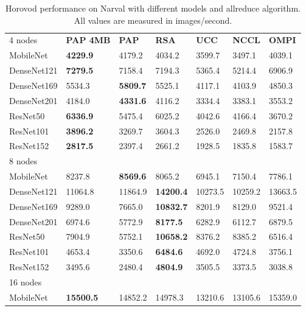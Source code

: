\begin{table}
    \centering
    \caption{
        Horovod performance on Narval with different models and allreduce algorithm.
        All values are measured in images/second.
    }
    \begin{tabular}{lllllll}
     4 nodes    & \textbf{PAP 4MB} & \textbf{PAP} & \textbf{RSA} & \textbf{UCC} & \textbf{NCCL} & \textbf{OMPI} \\
    MobileNet   & \textbf{4229.9}    & 4179.2       & 4034.2  & 3599.7  & 3497.1  & 4039.1  \\
    DenseNet121 & \textbf{7279.5}    & 7158.4       & 7194.3  & 5365.4  & 5214.4  & 6906.9  \\
    DenseNet169 & 5534.3    & \textbf{5809.7}       & 5525.1  & 4117.1  & 4103.9  & 4850.3  \\
    DenseNet201 & 4184.0      & \textbf{4331.6}       & 4116.2  & 3334.4  & 3383.1  & 3553.2  \\
    ResNet50    & \textbf{6336.9}    & 5475.4       & 6025.2  & 4042.6  & 4166.4  & 3670.2  \\
    ResNet101   & \textbf{3896.2}    & 3269.7       & 3604.3  & 2526.0    & 2469.8  & 2157.8  \\
    ResNet152   & \textbf{2817.5}    & 2397.4       & 2661.2  & 1928.5  & 1835.8  & 1583.7  \\ \hline
    8 nodes     & ~ & ~ & ~     & ~     & ~    & ~    \\ 
    MobileNet   & 8237.8    & \textbf{8569.6}       & 8065.2  & 6945.1  & 7150.4  & 7786.1  \\
    DenseNet121 & 11064.8   & 11864.9      & \textbf{14200.4} & 10273.5 & 10259.2 & 13663.5 \\
    DenseNet169 & 9289.0      & 7665.0         & \textbf{10832.7} & 8201.9  & 8129.0    & 9521.4  \\
    DenseNet201 & 6974.6    & 5772.9       & \textbf{8177.5}  & 6282.9  & 6112.7  & 6879.5  \\
    ResNet50    & 7904.9    & 5752.1       & \textbf{10658.2} & 8376.2  & 8385.2  & 6516.4  \\
    ResNet101   & 4653.4    & 3350.6       & \textbf{6484.6}  & 4692.0    & 4724.8  & 3756.1  \\
    ResNet152   & 3495.6    & 2480.4       & \textbf{4804.9}  & 3505.5  & 3373.5  & 3038.8  \\ \hline
    16 nodes    & ~ & ~ & ~     & ~     & ~    & ~    \\
    MobileNet   & \textbf{15500.5}   & 14852.2      & 14978.3 & 13210.6 & 13105.6 & 15359.0   \\

\end{tabular}
\end{table}
